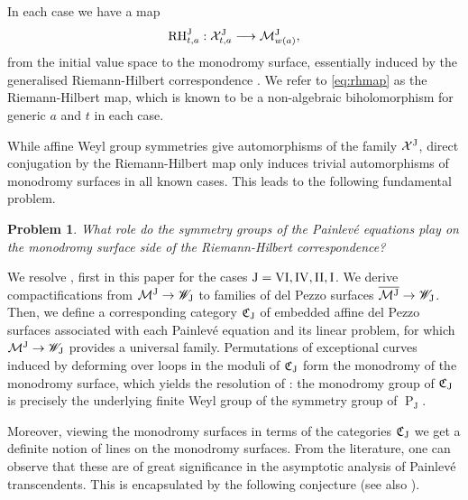 \documentclass[a4paper,reqno]{amsart}
\numberwithin{equation}{section}
\newcommand{\pain}[1]{\operatorname{P}_{\mathrm{#1}}}
\newtheorem{problem}[theorem]{Problem}
\numberwithin{equation}{section}
\begin{document}
In each case we have a map 
\begin{equation}\label{eq:rhmap}
    \operatorname{RH}^{\rm{J}}_{t,a} : \mathcal{X}^{\rm{J}}_{t,a} \longrightarrow \mathcal{M}^{\rm{J}}_{w(a)},
\end{equation}
from the initial value space to the monodromy surface, essentially induced by the generalised Riemann-Hilbert correspondence \cite{malgrange91}. We refer to \eqref{eq:rhmap} as the Riemann-Hilbert map, which is known to be a non-algebraic biholomorphism for generic $a$ and $t$ in each case.

While affine Weyl group symmetries give automorphisms of the family $\mathcal{X}^{\rm{J}}$, direct conjugation by the Riemann-Hilbert map only induces trivial automorphisms of monodromy surfaces in all known cases.
This leads to the following fundamental problem. 

\begin{problem}\label{main:problem}
What role do the symmetry groups of the Painlev\'e equations play on the monodromy surface side of the Riemann-Hilbert correspondence?
\end{problem}


We resolve , first in this paper for the cases $\rm{J}=\rm{VI},\rm{IV},\rm{II},\rm{I}$.
We derive compactifications from $\mathcal{M}^{\rm{J}}\to\mathscr{W}_{\rm{J}}$ to families of del Pezzo surfaces 
$\overline{\mathcal{M}^{\rm{J}}} \to \mathscr{W}_{\rm{J}}$.
 Then, we define a corresponding category $\mathfrak{C}_{\rm{J}}$ of embedded affine del Pezzo surfaces associated with each Painlevé equation and its linear problem, for which $\mathcal{M}^{\rm{J}}\to\mathscr{W}_{\rm{J}}$ provides a universal family.
Permutations of exceptional curves 
induced by deforming over loops in the moduli of $\mathfrak{C}_{\rm{J}}$ form the monodromy of the monodromy surface, which yields the resolution of : the monodromy group of $\mathfrak{C}_{\rm{J}}$ is precisely the underlying finite Weyl group of the symmetry group of $\pain{J}$.



Moreover, viewing the monodromy surfaces in terms of the categories $\mathfrak{C}_{\rm{J}}$ we get a definite notion of lines on the monodromy surfaces.
From the literature, one can observe that these are of great significance in the asymptotic analysis of Painlev\'e transcendents. 
This is encapsulated by the following conjecture (see also \cites{ohyamastrasbourg, ramiswebseminaronpainlevetalk}). 
\end{document}
